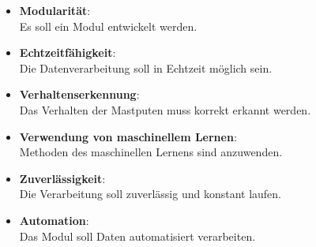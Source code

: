 \begin{itemize}
    \item \textbf{Modularität}: \\
    Es soll ein Modul entwickelt werden. 
    \item \textbf{Echtzeitfähigkeit}: \\
    Die Datenverarbeitung soll in Echtzeit möglich sein.
    \item \textbf{Verhaltenserkennung}: \\
    Das Verhalten der Mastputen muss korrekt erkannt werden.
    \item \textbf{Verwendung von maschinellem Lernen}: \\
    Methoden des maschinellen Lernens sind anzuwenden.
    \item \textbf{Zuverlässigkeit}: \\
    Die Verarbeitung soll zuverlässig und konstant laufen.
    \item \textbf{Automation}: \\
    Das Modul soll Daten automatisiert verarbeiten. 
\end{itemize}
